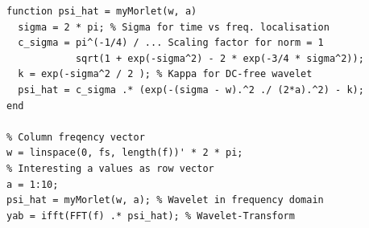 \begin{lstlisting}[style=Matlab-editor]
% Example for Morlet-Wavelet
function psi_hat = myMorlet(w, a)
  sigma = 2 * pi; % Sigma for time vs freq. localisation
  c_sigma = pi^(-1/4) / ... Scaling factor for norm = 1
            sqrt(1 + exp(-sigma^2) - 2 * exp(-3/4 * sigma^2));
  k = exp(-sigma^2 / 2 ); % Kappa for DC-free wavelet
  psi_hat = c_sigma .* (exp(-(sigma - w).^2 ./ (2*a).^2) - k);
end

% Column freqency vector
w = linspace(0, fs, length(f))' * 2 * pi; 
% Interesting a values as row vector
a = 1:10; 
psi_hat = myMorlet(w, a); % Wavelet in frequency domain
yab = ifft(FFT(f) .* psi_hat); % Wavelet-Transform
\end{lstlisting}

